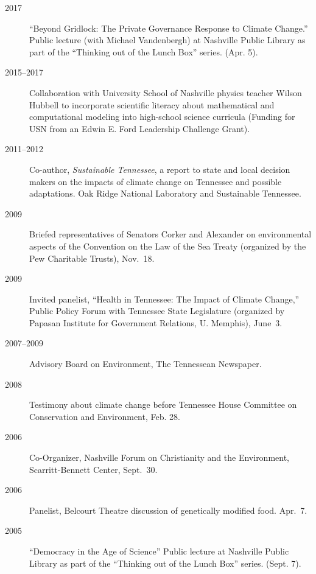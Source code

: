 \documentclass[10pt]{article}
\begin{document}
\begin{description}
            \item[2017] ``Beyond Gridlock: The Private Governance Response to Climate Change.'' Public lecture (with Michael Vandenbergh) at Nashville Public Library as part of the ``Thinking out of the Lunch Box'' series. (Apr. 5).
            \item[2015--2017] Collaboration with University School of Nashville physics teacher Wilson Hubbell to incorporate scientific literacy about mathematical and computational modeling into high-school science curricula (Funding for USN from an Edwin E. Ford Leadership Challenge Grant).
            \item[2011--2012] Co-author, \emph{Sustainable Tennessee}, a report to state and local decision makers on the impacts of climate change on Tennessee and possible adaptations. Oak Ridge National Laboratory and Sustainable Tennessee.
            \item[2009] Briefed representatives of Senators Corker and Alexander on environmental aspects of the Convention on the Law of the Sea Treaty (organized by the Pew Charitable Trusts), Nov.~18.
            \item[2009] Invited panelist, ``Health in Tennessee: The Impact of Climate Change,'' Public Policy Forum with Tennessee State Legislature (organized by Papasan Institute for Government Relations, U. Memphis), June~3.
            \item[2007--2009] Advisory Board on Environment, The Tennessean Newspaper.
            \item[2008] Testimony about climate change before Tennessee House Committee on Conservation and Environment, Feb. 28.
            \item[2006] Co-Organizer, Nashville Forum on Christianity and the Environment, Scarritt-Bennett Center, Sept.~30.
            \item[2006] Panelist, Belcourt Theatre discussion of genetically modified food. Apr.~7.
            \item[2005] ``Democracy in the Age of Science'' Public lecture at Nashville Public Library as part of the ``Thinking out of the Lunch Box'' series. (Sept. 7).
        \end{description}
\end{document}
